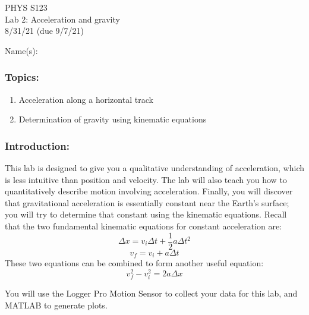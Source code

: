 \documentclass[11pt,letterpaper]{article}
\begin{document}
\setlength{\parindent}{0in}

\begin{flushright}
PHYS S123\\
Lab 2: Acceleration and gravity\\
8/31/21 (due 9/7/21)
\end{flushright}

Name(s):\\

\subsubsection*{Topics:}
\begin{enumerate}
\setlength{\parskip}{3pt}
\item Acceleration along a horizontal track
\item Determination of gravity using kinematic equations
\end{enumerate}

\subsubsection*{Introduction:}
This lab is designed to give you a qualitative understanding of acceleration, which is less intuitive than position and velocity. The lab will also teach you how to quantitatively describe motion involving acceleration. Finally, you will discover that gravitational acceleration is essentially constant near the Earth's surface; you will try to determine that constant using the kinematic equations. Recall that the two fundamental kinematic equations for constant acceleration are:
$$\Delta{x}=v_i\Delta{t}+\frac{1}{2}a\Delta{t}^2$$
$$v_f=v_i+a\Delta{t}$$
These two equations can be combined to form another useful equation:
$$v_f^2-v_i^2=2a\Delta{x}$$

You will use the Logger Pro Motion Sensor to collect your data for this lab, and MATLAB to generate plots.\\
\end{document}
